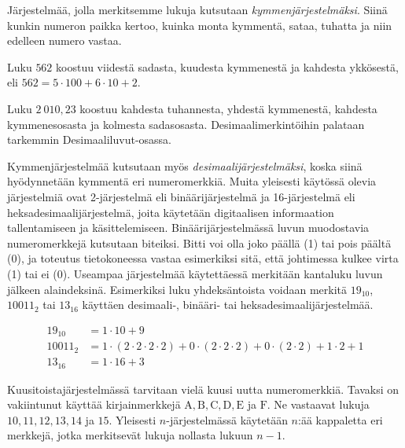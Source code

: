 Järjestelmää, jolla merkitsemme lukuja kutsutaan \emph{kymmenjärjestelmäksi}. Siinä kunkin numeron paikka kertoo, kuinka monta kymmentä, sataa, tuhatta ja niin edelleen numero vastaa.

\begin{esimerkki}
Luku $562$ koostuu viidestä sadasta, kuudesta kymmenestä ja kahdesta ykkösestä, eli $562= 5 \cdot 100 + 6 \cdot 10 + 2$.

Luku $2~010,23$ koostuu kahdesta tuhannesta, yhdestä kymmenestä, kahdesta kymmenesosasta ja kolmesta sadasosasta. Desimaalimerkintöihin palataan tarkemmin Desimaaliluvut-osassa.
\end{esimerkki}



Kymmenjärjestelmää kutsutaan myös \emph{desimaalijärjestelmäksi}, koska siinä hyödynnetään kymmentä eri numeromerkkiä. Muita yleisesti käytössä olevia järjestelmiä ovat 2-järjestelmä eli binäärijärjestelmä ja 16-järjestelmä eli heksadesimaalijärjestelmä, joita käytetään digitaalisen informaation tallentamiseen ja käsittelemiseen. Binäärijärjestelmässä luvun muodostavia numeromerkkejä kutsutaan biteiksi. Bitti voi olla joko päällä (1) tai pois päältä (0), ja toteutus tietokoneessa vastaa esimerkiksi sitä, että johtimessa kulkee virta (1) tai ei (0). Useampaa järjestelmää käytettäessä merkitään kantaluku luvun jälkeen alaindeksinä. Esimerkiksi luku yhdeksäntoista voidaan merkitä $19_{10}$, $10011_{2}$ tai $13_{16}$ käyttäen desimaali-, binääri- tai heksadesimaalijärjestelmää.

\begin{esimerkki}
\begin{align*}
19_{10} &= 1 \cdot 10 + 9 \\
10011_{2} &= 1 \cdot (2 \cdot 2 \cdot 2 \cdot 2) + 0 \cdot (2 \cdot 2 \cdot 2) + 0 \cdot (2 \cdot 2) + 1 \cdot 2 + 1 \\
13_{16} &= 1 \cdot 16 + 3
\end{align*}
\end{esimerkki}

Kuusitoistajärjestelmässä tarvitaan vielä kuusi uutta numeromerkkiä. Tavaksi on vakiintunut käyttää kirjainmerkkejä $\mathrm{A, B, C, D, E}$ ja $\mathrm{F}$. Ne vastaavat lukuja $10, 11, 12, 13, 14$ ja $15$. Yleisesti $n$-järjestelmässä käytetään $n$:ää kappaletta eri merkkejä, jotka merkitsevät lukuja nollasta lukuun $n-1$.

